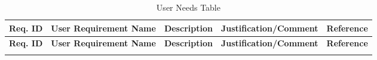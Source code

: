 \pagestyle{empty}
\begin{landscape}
\begin{longtable}{|p{2cm}|>{\RaggedRight\arraybackslash}p{6cm}|>{\RaggedRight\arraybackslash}p{6cm}|>{\RaggedRight\arraybackslash}p{6cm}|p{2cm}|}
\caption{User Needs Table}
\label{tab:user_requirements_table} \\
\hline 
\textbf{Req. ID} & \textbf{User Requirement Name} & \textbf{Description} & \textbf{Justification/Comment} & \textbf{Reference}\\
\hline
\endfirsthead

\hline
\textbf{Req. ID} & \textbf{User Requirement Name} & \textbf{Description} & \textbf{Justification/Comment} & \textbf{Reference}\\
\hline
\endhead

\hline
\endfoot

\hline
\endlastfoot


\end{longtable}
\end{landscape}
